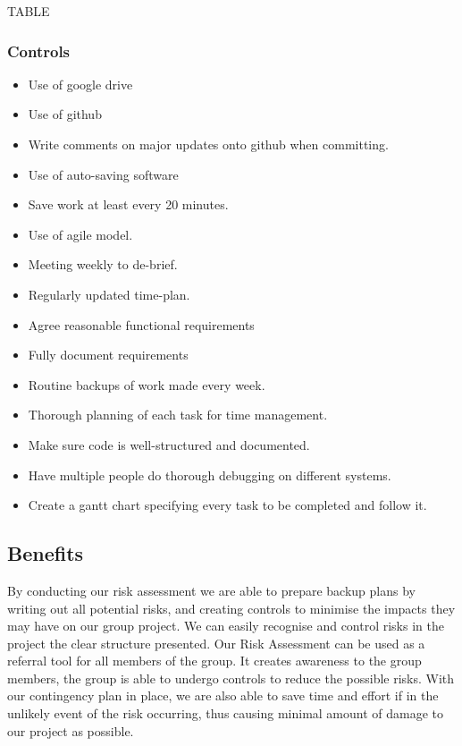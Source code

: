 \documentclass[12pt]{article}
\begin{document}
     TABLE
     
     \subsubsection{Controls}
    \begin{itemize}
    
\item Use of google drive
\item Use of github
\item Write comments on major updates onto github when committing.
\item Use of auto-saving software
\item Save work at least every 20 minutes.
\item Use of agile model.
\item Meeting weekly to de-brief.
\item Regularly updated time-plan.
\item Agree reasonable functional requirements
\item Fully document requirements
\item Routine backups of work made every week.
\item Thorough planning of each task for time management.
\item Make sure code is well-structured and documented.
\item Have multiple people do thorough debugging on different systems.
\item Create a gantt chart specifying every task to be completed and follow it. 
\end{itemize}

\subsection{Benefits}

By conducting our risk assessment we are able to prepare backup plans by writing out all potential risks, and creating controls to minimise the impacts they may have on our group project. We can easily recognise and control risks in the project the clear structure presented. Our Risk Assessment can be used as a referral tool for all members of the group. It creates awareness to the group members, the group is able to undergo controls to reduce the possible risks. With our contingency plan in place, we are also able to save time and effort if in the unlikely event of the risk occurring, thus causing minimal amount of damage to our project as possible. 
\end{document}
